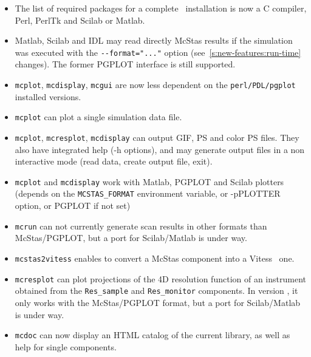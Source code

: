 \begin{itemize}
\item The list of required packages for a complete \MCS\ installation is now a C
    compiler, Perl, PerlTk and Scilab or Matlab.
\item Matlab, Scilab and IDL may read directly McStas results if the simulation
    was executed with the \verb+--format="..."+ option 
    (see~\ref{s:new-features:run-time} changes). The former PGPLOT interface is still
    supported. 
      
        
\item \verb+mcplot+, \verb+mcdisplay+, \verb+mcgui+ are now less dependent on the
    \verb+perl/PDL/pgplot+ installed versions. 
\item \verb+mcplot+ can plot a single simulation data file.
\item \verb+mcplot+, \verb+mcresplot+, \verb+mcdisplay+ can output GIF, PS and color
    PS files. They also have integrated help (-h options), and may generate output
    files in a non interactive mode (read data, create output file, exit).
\item \verb+mcplot+ and \verb+mcdisplay+ work with Matlab, PGPLOT and Scilab plotters
   (depends on the \verb+MCSTAS_FORMAT+ environment variable, or -pPLOTTER option, or
   PGPLOT if not set)
\item \verb+mcrun+ can not currently generate scan results in other formats than
   McStas/PGPLOT, but a port for Scilab/Matlab is under way. 
\item \verb+mcstas2vitess+ enables to convert a McStas component into a
   Vitess~\cite{vitess_webpage} one. 
\item \verb+mcresplot+ can plot projections of the 4D resolution function of an 
   instrument obtained from the \verb+Res_sample+ and \verb+Res_monitor+ components.
   In version \version, it only works with the McStas/PGPLOT format, 
   but a port for Scilab/Matlab is under way. 
\item \verb+mcdoc+ can now display an HTML catalog of the current library, as well as help for single components. 
\end{itemize}
